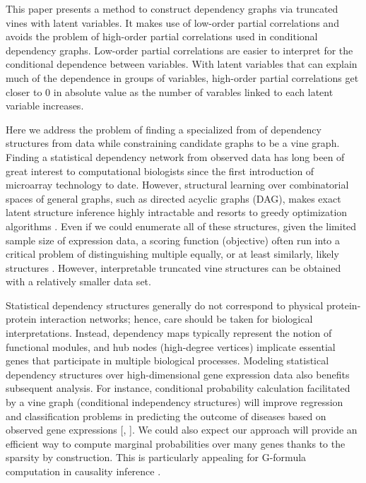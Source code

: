 \documentclass[a4paper]{article}
\begin{document}
This paper presents a method to construct dependency graphs via
truncated vines with latent variables. It makes use of low-order
partial correlations and avoids the problem of high-order partial
correlations used in conditional dependency graphs. Low-order partial
correlations are easier to interpret for the conditional dependence
between variables. With latent variables that can explain much of the
dependence in groups of variables, high-order partial correlations get
closer to 0 in absolute value as the number of varables linked to each
latent variable increases.

Here we address the problem of finding a specialized from of
dependency structures from data while constraining candidate graphs to
be a vine graph. Finding a statistical dependency network from
observed data has long been of great interest to computational
biologists since the first introduction of microarray technology to
date. However, structural learning over combinatorial spaces of
general graphs, such as directed acyclic graphs (DAG), makes exact
latent structure inference highly intractable and resorts to greedy
optimization algorithms \cite{friedman2000using}. Even if we could
enumerate all of these structures, given the limited sample size of
expression data, a scoring function (objective) often run into a
critical problem of distinguishing multiple equally, or at least
similarly, likely structures \cite{chickering2002learning}. However,
interpretable truncated vine structures can be obtained with a
relatively smaller data set.

Statistical dependency structures generally do not correspond to
physical protein-protein interaction networks; hence, care should be
taken for biological interpretations. Instead, dependency maps
typically represent the notion of functional modules, and hub nodes
(high-degree vertices) implicate essential genes that participate in
multiple biological processes. Modeling statistical dependency
structures over high-dimensional gene expression data also benefits
subsequent analysis. For instance, conditional probability calculation
facilitated by a vine graph (conditional independency structures) will
improve regression and classification problems in predicting the
outcome of diseases based on observed gene expressions
[\cite{friedman1997bayesian}, \cite{chuang2007network}]. We could also
expect our approach will provide an efficient way to compute marginal
probabilities over many genes thanks to the sparsity by
construction. This is particularly appealing for G-formula computation
in causality inference \cite{naimi2017introduction}.






%
\end{document}
